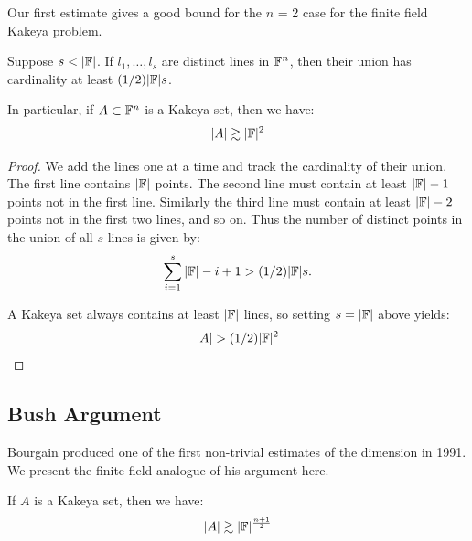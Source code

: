 Our first estimate gives a good bound for the $n$ = 2 case for the finite field Kakeya problem.

\begin{lemma}
    Suppose $s<|\FF|$. If $l_1, \dots, l_s$ are distinct lines in $\mathbb F^n$, then their union has cardinality at least $(1/2)|\mathbb F|s$. 

    In particular, if $A \subset \mathbb F^n$ is a Kakeya set, then we have:
    \[
      |A| \gtrsim |\mathbb F|^2  
    \] \label{lem:kak-first-estimate}
\end{lemma} 
\begin{proof}
    We add the lines one at a time and track the cardinality of their union. The first line contains $|\mathbb F|$ points. The second line must contain at least $|\mathbb F| -1$ points not in the first line. Similarly the third line must contain at least $|\mathbb F| -2$ points not in the first two lines, and so on. Thus the number of distinct points in the union of all $s$ lines is given by:
    \[
      \sum_{i=1}^{s} |\mathbb F| - i + 1  > (1/2) |\mathbb F| s.
    \]

    A Kakeya set always contains at least $|\mathbb F|$ lines, so setting $s=|\mathbb F|$ above yields:
    \[
        |A| > (1/2) |\mathbb F|^2 
    \]

\end{proof}

\subsection{Bush Argument} 
Bourgain produced one of the first non-trivial estimates of the dimension in 1991.\cite{BUSH1991} We present the finite field analogue of his argument here.\cite{GUTH2016}
\begin{theorem}

If $A$ is a Kakeya set, then we have:
$$|A| \gtrsim |\mathbb F|^{\frac{n+1}{2}}$$
\end{theorem}

